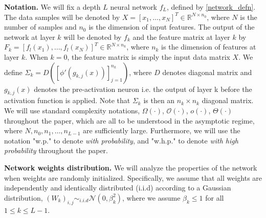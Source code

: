 \documentclass{article}
\theoremstyle{plain}
\theoremstyle{definition}
\theoremstyle{remark}
\newcommand\R{\mathbb{R}}
\begin{document}
\textbf{Notation.} We will fix a depth $L$ neural network $f_L$, defined by \eqref{network_defn}. The data samples will be denoted by 
$X = [x_1,\ldots,x_N]^T \in \R^{N\times n_0}$, where $N$ is the number of samples and $n_0$ is the dimension of input features. The output of the network at layer $k$ will be denoted by $f_k$ and the feature matrix at layer $k$ 
by $F_k = [f_l(x_1),\ldots,f_l(x_N)]^T \in \R^{N \times n_k}$, where $n_k$ is the dimension of features at layer $k$. When $k = 0$, the feature matrix is simply the input data matrix $X$.
We define
$\Sigma_k = D([\phi'(g_{k,j}(x))]_{j=1}^{n_k})$, where $D$ denotes diagonal matrix and 
$g_{k,j}(x)$ denotes the pre-activation neuron i.e. the output of layer k before the activation function is applied.
Note that $\Sigma_k$ is then an $n_k \times n_k$ diagonal matrix. 
We will use standard complexity notations, $\Omega(\cdot)$, 
$\mathcal{O}(\cdot)$, $o(\cdot)$, $\Theta(\cdot)$ throughout the paper, which are all to be understood in the asymptotic regime, where $N, n_0, n_1,\ldots,n_{L-1}$ are sufficiently large. %
Furthermore, we will use the notation "w.p." to denote \textit{with probability}, and "w.h.p." to denote \textit{with high probability} throughout the paper.



\textbf{Network weights distribution.} We will analyze the properties of the network when weights are randomly initialized. Specifically, we assume that all weights are independently and identically distributed (i.i.d) according to a Gaussian distribution, $(W_k)_{i,j} \sim_{i.i.d} \mathcal{N}(0, \beta_k^2)$, where we assume
$\beta_k \leq 1$ for all $1 \leq k \leq L-1$.
\end{document}
